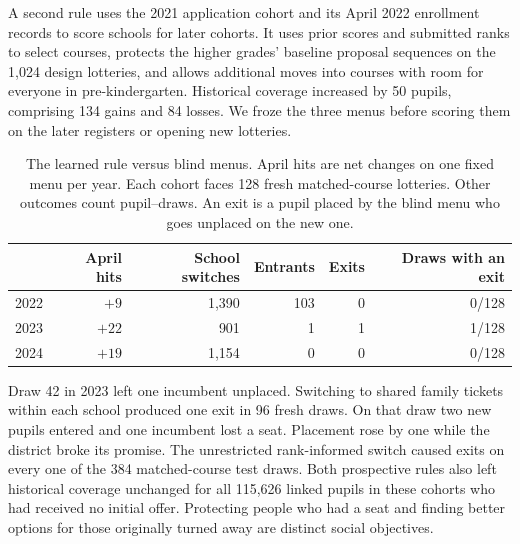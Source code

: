 A second rule uses the 2021 application cohort and its April 2022 enrollment records to score schools for later cohorts. It uses prior scores and submitted ranks to select courses, protects the higher grades' baseline proposal sequences on the 1,024 design lotteries, and allows additional moves into courses with room for everyone in pre-kindergarten. Historical coverage increased by 50 pupils, comprising 134 gains and 84 losses. We froze the three menus before scoring them on the later registers or opening new lotteries.

\begin{table}[ht]\centering\small
\caption{The learned rule versus blind menus. April hits are net changes on one fixed menu per year. Each cohort faces 128 fresh matched-course lotteries. Other outcomes count pupil--draws. An exit is a pupil placed by the blind menu who goes unplaced on the new one.}\label{tab:retain-held}
\begin{tabular}{@{}lrrrrr@{}}\toprule
 & April hits & School switches & Entrants & Exits & Draws with an exit\\\midrule
2022 & $+9$ & 1,390 & 103 & 0 & 0/128\\
2023 & $+22$ & 901 & 1 & 1 & 1/128\\
2024 & $+19$ & 1,154 & 0 & 0 & 0/128\\\bottomrule
\end{tabular}
\end{table}
Draw 42 in 2023 left one incumbent unplaced. Switching to shared family tickets within each school produced one exit in 96 fresh draws. On that draw two new pupils entered and one incumbent lost a seat. Placement rose by one while the district broke its promise. The unrestricted rank-informed switch caused exits on every one of the 384 matched-course test draws. Both prospective rules also left historical coverage unchanged for all 115,626 linked pupils in these cohorts who had received no initial offer. Protecting people who had a seat and finding better options for those originally turned away are distinct social objectives.

